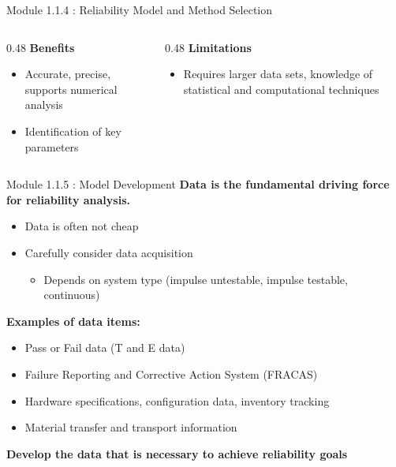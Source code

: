 \documentclass{beamer}
\begin{document}
\begin{frame}{Module 1.1.4 : Reliability Model and Method Selection}
\begin{itemize}
\end{itemize}
\vspace{0.25cm}
\begin{columns}[T]
\begin{column}{0.48\textwidth}
\textbf{Benefits}
\begin{itemize}
\item Accurate, precise, supports numerical analysis
\item Identification of key parameters
\end{itemize}
\end{column}
\begin{column}{0.48\textwidth}
\textbf{Limitations}
\begin{itemize}
\item Requires larger data sets, knowledge of statistical and computational techniques
\end{itemize}
\end{column}
\end{columns}
\end{frame}

\begin{frame}{Module 1.1.5 : Model Development}
\small
\textbf{Data is the fundamental driving force for reliability analysis.}
\begin{itemize}
\small
\item Data is often not cheap
\item Carefully consider data acquisition
\begin{itemize}
\small
\item Depends on system type (impulse untestable, impulse testable, continuous)
\end{itemize}
\end{itemize}
\textbf{Examples of data items:}
\begin{itemize}
\small
\item Pass or Fail data (T and E data)
\item Failure Reporting and Corrective Action System (FRACAS)
\item Hardware specifications, configuration data, inventory tracking
\item Material transfer and transport information
\end{itemize}
\textbf{Develop the data that is necessary to achieve reliability goals}
\end{frame}
\end{document}
